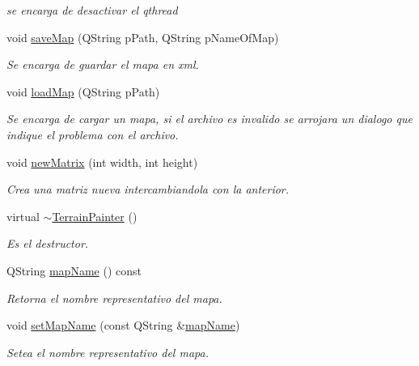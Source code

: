 \begin{DoxyCompactItemize}
\begin{DoxyCompactList}\small\item\em se encarga de desactivar el qthread \end{DoxyCompactList}\item 
void \hyperlink{class_terrain_painter_a92d6e3c8f53f4f0a2ef6e896480d7080}{save\-Map} (Q\-String p\-Path, Q\-String p\-Name\-Of\-Map)
\begin{DoxyCompactList}\small\item\em Se encarga de guardar el mapa en xml. \end{DoxyCompactList}\item 
void \hyperlink{class_terrain_painter_aec8ab73fffb4c09518dab3544ce2812e}{load\-Map} (Q\-String p\-Path)
\begin{DoxyCompactList}\small\item\em Se encarga de cargar un mapa, si el archivo es invalido se arrojara un dialogo que indique el problema con el archivo. \end{DoxyCompactList}\item 
void \hyperlink{class_terrain_painter_aacd640eb9007ff64b3f82421f9bf57e6}{new\-Matrix} (int width, int height)
\begin{DoxyCompactList}\small\item\em Crea una matriz nueva intercambiandola con la anterior. \end{DoxyCompactList}\item 
\hypertarget{class_terrain_painter_addc5c0a796059d54c972b135228bb504}{virtual \hyperlink{class_terrain_painter_addc5c0a796059d54c972b135228bb504}{$\sim$\-Terrain\-Painter} ()}\label{class_terrain_painter_addc5c0a796059d54c972b135228bb504}

\begin{DoxyCompactList}\small\item\em Es el destructor. \end{DoxyCompactList}\item 
Q\-String \hyperlink{class_terrain_painter_ab7332903ffc7d966f34d033f42c29aee}{map\-Name} () const 
\begin{DoxyCompactList}\small\item\em Retorna el nombre representativo del mapa. \end{DoxyCompactList}\item 
void \hyperlink{class_terrain_painter_afb7f32fd9a50bb1f4845860bba8da920}{set\-Map\-Name} (const Q\-String \&\hyperlink{class_terrain_painter_ab7332903ffc7d966f34d033f42c29aee}{map\-Name})
\begin{DoxyCompactList}\small\item\em Setea el nombre representativo del mapa. \end{DoxyCompactList}\end{DoxyCompactItemize}
